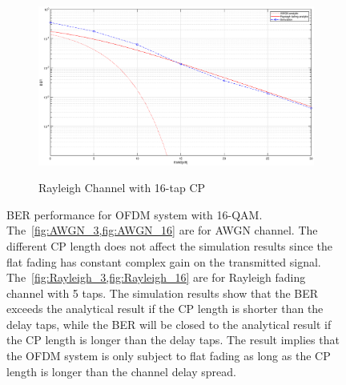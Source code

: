\begin{figure}[!htbp]
\begin{subfigure}[t]{0.5\linewidth}
        \label{fig:Rayleigh_3}
    \end{subfigure}%
    \begin{subfigure}[t]{0.5\linewidth}
        \centering
        \caption{Rayleigh Channel with 16-tap CP}
        \includegraphics[width=\linewidth]{Rayleigh_16.eps}
        \label{fig:Rayleigh_16}
    \end{subfigure}%
    \caption{BER performance for OFDM system with 16-QAM. The~\cref{fig:AWGN_3,fig:AWGN_16} are for AWGN channel. The different CP length does not affect the simulation results since the flat fading has constant complex gain on the transmitted signal. The~\cref{fig:Rayleigh_3,fig:Rayleigh_16} are for Rayleigh fading channel with 5 taps. The simulation results show that the BER exceeds the analytical result if the CP length is shorter than the delay taps, while the BER will be closed to the analytical result if the CP length is longer than the delay taps. The result implies that the OFDM system is only subject to flat fading as long as the CP length is longer than the channel delay spread.}
    \label{fig:BER}
\end{figure}
